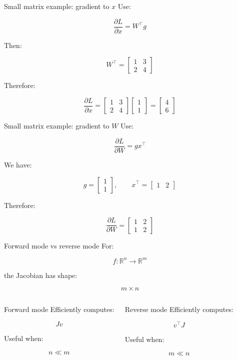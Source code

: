 \documentclass[10pt,aspectratio=169]{beamer}
\newcommand{\grad}[2]{\frac{\partial #1}{\partial #2}}
\begin{document}
\begin{frame}[t]{Small matrix example: gradient to \(x\)}
Use:

\[
\grad{L}{x}=W^\top g
\]

Then:

\[
W^\top=
\begin{bmatrix}
1&3\\
2&4
\end{bmatrix}
\]

Therefore:

\[
\grad{L}{x}
=
\begin{bmatrix}
1&3\\
2&4
\end{bmatrix}
\begin{bmatrix}
1\\
1
\end{bmatrix}
=
\boxed{
\begin{bmatrix}
4\\
6
\end{bmatrix}
}
\]
\end{frame}

\begin{frame}[t]{Small matrix example: gradient to \(W\)}
Use:

\[
\grad{L}{W}
=
gx^\top
\]

We have:

\[
g=
\begin{bmatrix}
1\\
1
\end{bmatrix},
\qquad
x^\top=
\begin{bmatrix}
1&2
\end{bmatrix}
\]

Therefore:

\[
\grad{L}{W}
=
\boxed{
\begin{bmatrix}
1&2\\
1&2
\end{bmatrix}
}
\]
\end{frame}

\begin{frame}[t]{Forward mode vs reverse mode}
For:

\[
f:\mathbb{R}^{n}\rightarrow\mathbb{R}^{m}
\]

the Jacobian has shape:

\[
m\times n
\]

\begin{columns}[T]
\begin{block}{Forward mode}
Efficiently computes:

\[
Jv
\]

Useful when:

\[
n\ll m
\]
\end{block}

\begin{block}{Reverse mode}
Efficiently computes:

\[
v^\top J
\]

Useful when:

\[
m\ll n
\]
\end{block}
\end{columns}
\end{frame}
\end{document}
